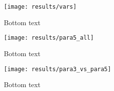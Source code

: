 \begin{figure}
    \centering
    \texttt{[image: results/vars]}
    \caption{Bottom text}
    \label{fig:para_vars}
\end{figure}

\begin{figure}
    \centering
    \texttt{[image: results/para5\_all]}
    \caption{Bottom text}
    \label{fig:para5_all}
\end{figure}

\begin{figure}
    \centering
    \texttt{[image: results/para3\_vs\_para5]}
    \caption{Bottom text}
    \label{fig:para3_vs_para5}
\end{figure}